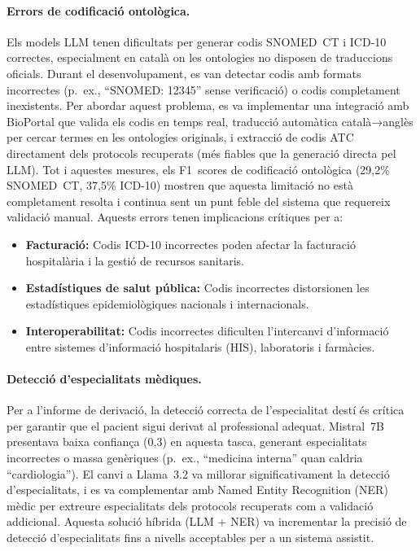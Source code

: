 \documentclass[CAT]{TFUOC}%
\begin{document}
\paragraph{Errors de codificació ontològica.}
Els models LLM tenen dificultats per generar codis SNOMED~CT i ICD-10 correctes, especialment en català on les ontologies no disposen de traduccions oficials. Durant el desenvolupament, es van detectar codis amb formats incorrectes (p.~ex., ``SNOMED: 12345'' sense verificació) o codis completament inexistents. Per abordar aquest problema, es va implementar una integració amb BioPortal que valida els codis en temps real, traducció automàtica català→anglès per cercar termes en les ontologies originals, i extracció de codis ATC directament dels protocols recuperats (més fiables que la generació directa pel LLM). Tot i aquestes mesures, els F1~scores de codificació ontològica (29,2\% SNOMED~CT, 37,5\% ICD-10) mostren que aquesta limitació no està completament resolta i continua sent un punt feble del sistema que requereix validació manual. Aquests errors tenen implicacions crítiques per a:
\begin{itemize}
    \item \textbf{Facturació:} Codis ICD-10 incorrectes poden afectar la facturació hospitalària i la gestió de recursos sanitaris.
    \item \textbf{Estadístiques de salut pública:} Codis incorrectes distorsionen les estadístiques epidemiològiques nacionals i internacionals.
    \item \textbf{Interoperabilitat:} Codis incorrectes dificulten l'intercanvi d'informació entre sistemes d'informació hospitalaris (HIS), laboratoris i farmàcies.
\end{itemize}

\paragraph{Detecció d'especialitats mèdiques.}
Per a l'informe de derivació, la detecció correcta de l'especialitat destí és crítica per garantir que el pacient sigui derivat al professional adequat. Mistral~7B presentava baixa confiança (0,3) en aquesta tasca, generant especialitats incorrectes o massa genèriques (p.~ex., ``medicina interna'' quan caldria ``cardiologia''). El canvi a Llama~3.2 va millorar significativament la detecció d'especialitats, i es va complementar amb Named Entity Recognition (NER) mèdic per extreure especialitats dels protocols recuperats com a validació addicional. Aquesta solució híbrida (LLM + NER) va incrementar la precisió de detecció d'especialitats fins a nivells acceptables per a un sistema assistit.
\end{document}
